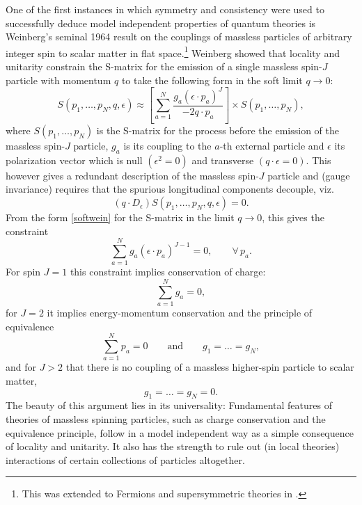 \documentclass[11pt,a4paper]{article}
\begin{document}
One of the first instances in which symmetry and consistency were used to successfully deduce model independent properties of quantum theories is Weinberg's seminal 1964 result \cite{Weinberg:1964ew,Weinberg:1965rz} on the couplings of massless particles of arbitrary integer spin to scalar matter in flat space.\footnote{This was extended to Fermions and supersymmetric theories in \cite{Grisaru:1976vm,Grisaru:1977kk}.} Weinberg showed that locality and unitarity constrain the S-matrix for the emission of a single massless spin-$J$ particle with momentum $q$ to take the following form in the soft limit $q\to 0$:
\begin{equation}\label{softwein}
    S\left(p_1,\ldots, p_N, q, \epsilon \right) \approx \left[\sum\limits^N_{a=1} \frac{g_a\left(\epsilon \cdot p_a\right)^J}{-2 q \cdot p_a}\right] \times S\left(p_1,\ldots, p_N \right),
\end{equation}
where $S\left(p_1,\ldots, p_N \right)$ is the S-matrix for the process before the emission of the massless spin-$J$ particle, $g_a$ is its coupling to the $a$-th external particle and $\epsilon$ its polarization vector which is null $\left(\epsilon^2=0\right)$ and transverse $\left(q \cdot \epsilon =0\right)$. This however gives a redundant description of the massless spin-$J$ particle and (gauge invariance) requires that the spurious longitudinal components decouple, viz.
\begin{equation}\label{ginvwein}
  \left(q \cdot D_{\epsilon}\right)  S\left(p_1,\ldots, p_N, q, \epsilon \right) = 0.
\end{equation}
From the form \eqref{softwein} for the S-matrix in the limit $q\to 0$, this gives the constraint
\begin{equation}
    \sum\limits^N_{a=1} g_a\left(\epsilon \cdot p_a\right)^{J-1} = 0, \qquad \forall \, p_a.
\end{equation}
For spin $J=1$ this constraint implies conservation of charge:
\begin{equation}\label{ccintro}
    \sum\limits^N_{a=1} g_a=0,
\end{equation}
for $J=2$ it implies energy-momentum conservation and the principle of equivalence
\begin{equation}\label{eqintro}
   \sum\limits^N_{a=1} p_a=0 \qquad \text{and} \qquad g_1=\ldots = g_N,
\end{equation}
and for $J>2$ that there is no coupling of a massless higher-spin particle  to scalar matter,
\begin{equation}\label{hsintro}
    g_1=\ldots = g_N=0.
\end{equation}
The beauty of this argument lies in its universality: Fundamental features of theories of massless spinning particles, such as charge conservation and the equivalence principle, follow in a model independent way as a simple consequence of locality and unitarity. It also has the strength to rule out (in local theories) interactions of certain collections of particles altogether.
\end{document}
